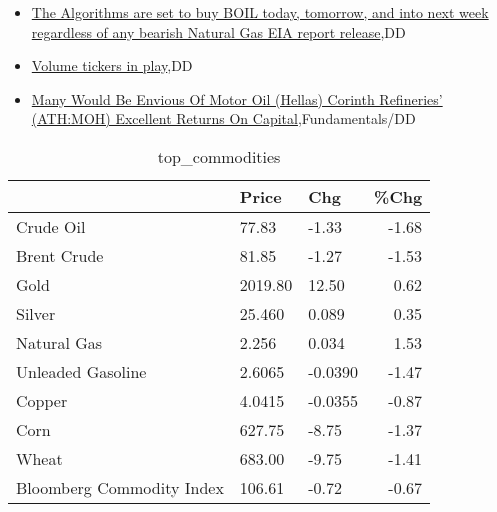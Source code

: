 \documentclass{article}%
\begin{document}
%
\begin{itemize}%
\item%
\href{https://reddit.com/r/wallstreetbets/comments/12swnm5/the\_algorithms\_are\_set\_to\_buy\_boil\_today\_tomorrow/}{The Algorithms are set to buy BOIL today, tomorrow, and into next week regardless of any bearish Natural Gas EIA report release},DD%
\item%
\href{https://reddit.com/r/wallstreetbets/comments/12svwcq/volume\_tickers\_in\_play/}{Volume tickers in play},DD%
\item%
\href{https://reddit.com/r/StockMarket/comments/12suar2/many\_would\_be\_envious\_of\_motor\_oil\_hellas\_corinth/}{Many Would Be Envious Of Motor Oil (Hellas) Corinth Refineries' (ATH:MOH) Excellent Returns On Capital},Fundamentals/DD%
\end{itemize}%


\begin{table}[htbp]%
\caption{top\_commodities}%
\centering%
\begin{adjustbox}{width=1\textwidth}%
\begin{tabular}{lllr}
\toprule
                          &   Price &     Chg &  \%Chg \\
\midrule
               Crude Oil  &   77.83 &   -1.33 & -1.68 \\
             Brent Crude  &   81.85 &   -1.27 & -1.53 \\
                    Gold  & 2019.80 &   12.50 &  0.62 \\
                  Silver  &  25.460 &   0.089 &  0.35 \\
             Natural Gas  &   2.256 &   0.034 &  1.53 \\
       Unleaded Gasoline  &  2.6065 & -0.0390 & -1.47 \\
                  Copper  &  4.0415 & -0.0355 & -0.87 \\
                    Corn  &  627.75 &   -8.75 & -1.37 \\
                   Wheat  &  683.00 &   -9.75 & -1.41 \\
Bloomberg Commodity Index &  106.61 &   -0.72 & -0.67 \\
\bottomrule
\end{tabular}
%
\end{adjustbox}%
\end{table}

%
\end{document}
